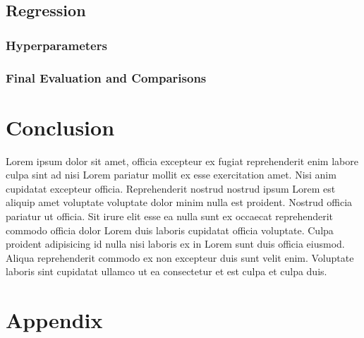 \documentclass[twoside,11pt]{report}
\begin{document}
\subsection{Regression}
\label{sec:regression}


\subsubsection{Hyperparameters}
\label{sec:hyperparameters2}



\subsubsection{Final Evaluation and Comparisons}
\label{sec:comparisons2}


\section{Conclusion}
\label{sec:conclusion}


Lorem ipsum dolor sit amet, officia excepteur ex fugiat reprehenderit enim labore culpa sint ad nisi Lorem pariatur mollit ex esse exercitation amet. Nisi anim cupidatat excepteur officia. Reprehenderit nostrud nostrud ipsum Lorem est aliquip amet voluptate voluptate dolor minim nulla est proident. Nostrud officia pariatur ut officia. Sit irure elit esse ea nulla sunt ex occaecat reprehenderit commodo officia dolor Lorem duis laboris cupidatat officia voluptate. Culpa proident adipisicing id nulla nisi laboris ex in Lorem sunt duis officia eiusmod. Aliqua reprehenderit commodo ex non excepteur duis sunt velit enim. Voluptate laboris sint cupidatat ullamco ut ea consectetur et est culpa et culpa duis.
























%
\newpage

\appendix
{}%
\section*{Appendix}
\label{app:appendix}
\end{document}
